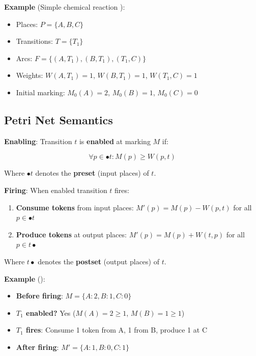 \textbf{Example} (Simple chemical reaction ):

\begin{itemize}
    \item Places: $P = \{A, B, C\}$
    \item Transitions: $T = \{T_1\}$
    \item Arcs: $F = \{(A,T_1), (B,T_1), (T_1,C)\}$
    \item Weights: $W(A,T_1)=1$, $W(B,T_1)=1$, $W(T_1,C)=1$
    \item Initial marking: $M_0(A)=2$, $M_0(B)=1$, $M_0(C)=0$
\end{itemize}

\subsection{Petri Net Semantics}
\label{subsec:pn-semantics}

\textbf{Enabling}: Transition $t$ is \textbf{enabled} at marking $M$ if:

\begin{equation}
\forall p \in \bullet t: M(p) \geq W(p,t)
\end{equation}

Where $\bullet t$ denotes the \textbf{preset} (input places) of $t$.

\textbf{Firing}: When enabled transition $t$ fires:

\begin{enumerate}
    \item \textbf{Consume tokens} from input places: $M'(p) = M(p) - W(p,t)$ for all $p \in \bullet t$
    \item \textbf{Produce tokens} at output places: $M'(p) = M(p) + W(t,p)$ for all $p \in t\bullet$
\end{enumerate}

Where $t\bullet$ denotes the \textbf{postset} (output places) of $t$.

\textbf{Example} ():

\begin{itemize}
    \item \textbf{Before firing}: $M = \{A:2, B:1, C:0\}$
    \item \textbf{$T_1$ enabled?} Yes ($M(A)=2 \geq 1$, $M(B)=1 \geq 1$)
    \item \textbf{$T_1$ fires}: Consume 1 token from A, 1 from B, produce 1 at C
    \item \textbf{After firing}: $M' = \{A:1, B:0, C:1\}$
\end{itemize}

